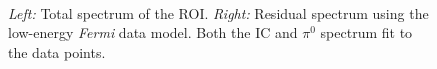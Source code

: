 \documentclass[a4paper]{article}
\newcommand{\Fermi}{\textit{Fermi} }
\begin{document}
\begin{figure}[h]
	\\
\caption{\textit{Left:} Total spectrum of the ROI. \textit{Right:} Residual spectrum using the low-energy \Fermi  data model. Both the IC and $\pi^0$ spectrum fit to the data points.}
\label{Fit_IC_pi0_to_ROI}
\end{figure}
\end{document}
